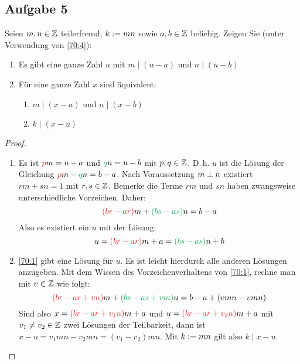 \subsection{Aufgabe 5}
Seien $m,n \in \mathbb{Z}{}$ teilerfremd, $k :={} mn$ sowie
$a,b \in \mathbb{Z}{}$ beliebig. Zeigen Sie (unter Verwendung von \autoref{70:4}):
\begin{enumerate}[label=\alph*)]
  \item Es gibt eine ganze Zahl $u$ mit $m \mid (u - a)$ und $n \mid (u - b)$
  \item Für eine ganze Zahl $x$ sind äquivalent:
        \begin{enumerate}[label=\roman*)]
          \item $m \mid (x - a)$ und $n \mid (x - b)$
          \item $k \mid (x - u)$
        \end{enumerate}
\end{enumerate}
\begin{proof}
  \begin{enumerate}[label=\alph*)]
    \item Es ist $\textcolor{Red}{p}m = u - a$ und
          $\textcolor{Green}{q}n = u - b$ mit $p,q \in \mathbb{Z}{}$.
          D.\,h. $u$ ist die Lösung der Gleichung
          $\textcolor{Red}{p}m - \textcolor{Green}{q}n = b - a$.
          Nach Voraussetzung $m \perp n$ existiert $rm + sn = 1$
          mit $r,s \in \mathbb{Z}{}$.
          Bemerke die Terme $rm$ und $sn$ haben zwangsweise unterschiedliche Vorzeichen.
          Daher:
          \begin{equation}
            \label{70:1}
            \textcolor{Red}{(br - ar)}m + \textcolor{Green}{(bs - as)}n = b - a
          \end{equation}
          Also es existiert ein $u$ mit der Lösung:
          \begin{equation*}
            u = \textcolor{Red}{(br - ar)}m + a = \textcolor{Green}{(bs - as)}n + b
          \end{equation*}
    \item {} \autoref{70:1} gibt eine Lösung für $u$.
          Es ist leicht hierdurch alle anderen Lösungen anzugeben.
          Mit dem Wissen des Vorzeichenverhaltens von \eqref{70:1},
          rechne man mit $v \in \mathbb{Z}{}$ wie folgt:
          \begin{equation*}
            \textcolor{Red}{(br - ar + vn)}m + \textcolor{Green}{(bs - as + vm)}n
            = b - a + (vmn - vmn)
          \end{equation*}
          Sind also $x = \textcolor{Red}{(br - ar + v_1n)}m + a$ und
          $u = \textcolor{Red}{(br - ar + v_2n)}m + a$ mit $v_1 \neq v_2 \in \mathbb{Z}{}$
          zwei Lösungen der Teilbarkeit,
          dann ist $x - u = v_1mn - v_2mn = (v_1 - v_2)mn$.
          Mit $k := mn$ gilt also $k \mid x - u$.
  \end{enumerate}
\end{proof}

